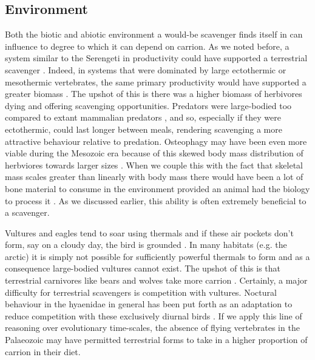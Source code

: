 \documentclass[a4paper,12pt]{article}
\begin{document}

\subsection*{Environment}
Both the biotic and abiotic environment a would-be scavenger finds itself in can influence to degree to which it can depend on carrion. 
As we noted before, a system similar to the Serengeti in productivity could have supported a terrestrial scavenger \citep{ruxton2004obligate}.
Indeed, in systems that were dominated by large ectothermic or mesothermic vertebrates, 
the same primary productivity would have supported a greater biomass \citep{mcnab2009resources}.
The upshot of this is there was a higher biomass of herbivores dying and offering scavenging opportunities.
Predators were large-bodied too compared to extant mammalian predators \citep{mcnab2009resources}, and so, especially if they were ectothermic, could last longer between meals, rendering scavenging a more attractive behaviour relative to predation.
Osteophagy may have been even more viable during the Mesozoic era because of this skewed body mass distribution of herbviores towards larger sizes \citep{10.1371/journal.pone.0051925}.
When we couple this with the fact that skeletal mass scales greater than linearly with body mass \citep{prange1979scaling} there would have been a lot of bone material to consume in the environment provided an animal had the biology to process it \citep{chure1997one}.
As we discussed earlier, this ability is often extremely beneficial to a scavenger.



Vultures and eagles tend to soar using thermals and if these air pockets don't form, say on a cloudy day, the bird is grounded \citep{mundy1992vultures}.
In many habitats (e.g. the arctic) it is simply not possible for sufficiently powerful thermals to form and as a consequence large-bodied vultures cannot exist.
The upshot of this is that terrestrial carnivores like bears and wolves take more carrion \citep{devault2003scavenging}.
Certainly, a major difficulty for terrestrial scavengers is competition with vultures.
Noctural behaviour in the hyaenidae in general has been put forth as an adaptation to reduce competition with these exclusively diurnal birds \citep{gittleman2013carnivore}.
If we apply this line of reasoning over evolutionary time-scales, the absence of flying vertebrates in the Palaeozoic may have permitted terrestrial forms to take in a higher proportion of carrion in their diet.
\end{document}
